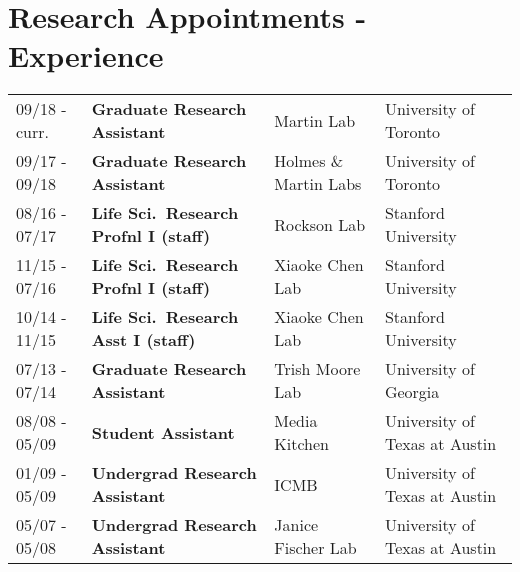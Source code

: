 \documentclass[letterpaper]{article}
\begin{document}
\section*{Research Appointments - Experience}
\begin{tabular}{llll}
09/18 - curr.	& {\bf Graduate Research Assistant} 		& Martin Lab 			& University of Toronto \\
09/17 - 09/18	& {\bf Graduate Research Assistant} 		& Holmes \& Martin Labs	& University of Toronto \\
08/16 - 07/17 	& {\bf Life Sci.\ Research Profnl I (staff)}	& Rockson Lab			& Stanford University \\
11/15 - 07/16 	& {\bf Life Sci.\ Research Profnl I (staff)}	& Xiaoke Chen Lab		& Stanford University \\
10/14 - 11/15 	& {\bf Life Sci.\ Research Asst I (staff)}	& Xiaoke Chen Lab		& Stanford University \\
07/13 - 07/14 	& {\bf Graduate Research Assistant}		& Trish Moore Lab		& University of Georgia \\
08/08 - 05/09 	& {\bf Student Assistant}				& Media Kitchen		& University of Texas at Austin \\
01/09 - 05/09 	& {\bf Undergrad Research Assistant}	& ICMB				& University of Texas at Austin \\
05/07 - 05/08 	& {\bf Undergrad Research Assistant}	& Janice Fischer Lab		& University of Texas at Austin \\
\end{tabular}


\end{document}
